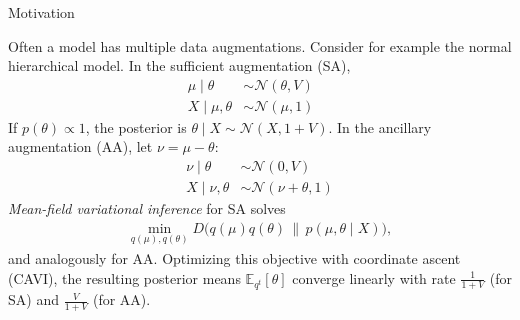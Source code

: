 \documentclass[final]{beamer}
\newlength{\onecolwid}
\begin{document}
\begin{frame}[t]
\begin{columns}[t]
\begin{column}{\onecolwid}
\begin{block}{Motivation}

Often a model has multiple data augmentations. Consider for example the normal hierarchical model. In the sufficient augmentation (SA),
\begin{align*}
\mu \mid \theta
&\sim \mathcal N(\theta,V) ~~~\,\,\,\,\\
X\mid \mu,\theta
&\sim \mathcal N(\mu,1)
\end{align*}
If $p(\theta)\propto 1$, the posterior is $\theta\mid X \sim \mathcal N(X,1+V)$. In the ancillary augmentation (AA), let $\nu=\mu-\theta$:
\begin{align*}
\nu \mid \theta
&\sim \mathcal N(0,V) \\
X\mid \nu,\theta
&\sim \mathcal N(\nu +\theta,1)
\end{align*}
{\sl Mean-field variational inference} for SA solves %
\begin{align*}
\min_{q(\mu),q(\theta)}D\big(q(\mu)q(\theta)\,\big\|\, p(\mu,\theta\mid X)\big),
\end{align*}
and analogously for AA. Optimizing this objective with coordinate ascent (CAVI), the resulting posterior means $\mathbb E_{q^t}[\theta]$ converge linearly with rate $\frac{1}{1+V}$ (for SA) and $\frac{V}{1+V}$ (for AA). 


\end{block}
\end{column}
\end{columns}
\end{frame}
\end{document}

